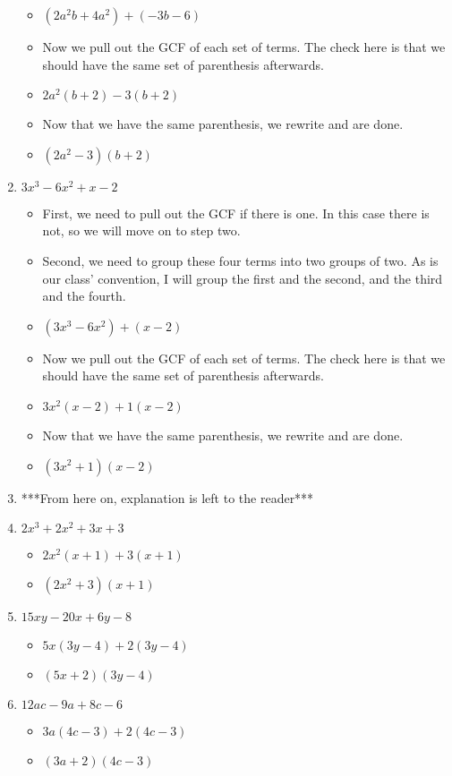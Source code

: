 \documentclass{article}
\begin{document}
\begin{enumerate}
\begin{itemize}
  \item [] $(2a^{2}b+4a^{2}) +(-3b-6)$
  \item Now we pull out the GCF of each set of terms. The check here is that we should have the same set of parenthesis afterwards.
  \item [] $2a^{2}(b+2)-3(b+2)$
  \item Now that we have the same parenthesis, we rewrite and are done.
  \item [] $(2a^{2}-3)(b+2)$
  \end{itemize}
\item $3x^{3} - 6x^{2} + x - 2$
  \begin{itemize}
  \item First, we need to pull out the GCF if there is one. In this case there is not, so we will move on to step two.
  \item Second, we need to group these four terms into two groups of two. As is our class' convention, I will group the first and the second, and the third and the fourth.
  \item [] $(3x^{3}-6x^{2}) +(x-2)$
  \item Now we pull out the GCF of each set of terms. The check here is that we should have the same set of parenthesis afterwards.
  \item [] $3x^{2}(x-2)+1(x-2)$
  \item Now that we have the same parenthesis, we rewrite and are done.
  \item [] $(3x^{2}+1)(x-2)$
  \end{itemize}
\item [] ***From here on, explanation is left to the reader***
\item $2x^{3} + 2x^{2} + 3x + 3$
  \begin{itemize}
  \item $2x^{2}(x+1)+3(x+1)$
  \item $(2x^{2}+3)(x+1)$
  \end{itemize}
\item $15xy - 20x + 6y - 8$
  \begin{itemize}
  \item $5x(3y-4)+2(3y-4)$
  \item $(5x+2)(3y-4)$
  \end{itemize}
\item $12ac - 9a + 8c - 6$
  \begin{itemize}
  \item $3a(4c-3)+2(4c-3)$
  \item $(3a+2)(4c-3)$

\end{itemize}
\end{enumerate}
\end{document}
